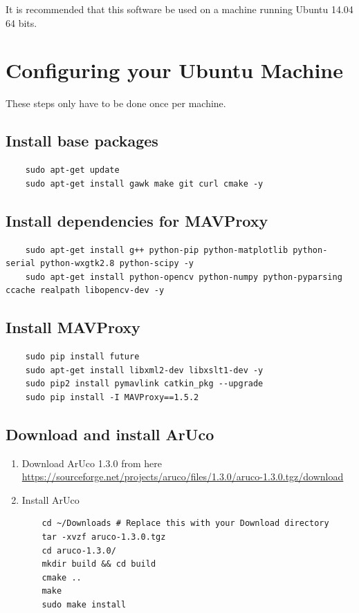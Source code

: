 \documentclass{report}
\begin{document}
It is recommended that this software be used on a machine running Ubuntu 14.04 64 bits.

\section{Configuring your Ubuntu Machine}
These steps only have to be done once per machine.
\subsection{Install base packages}
\begin{lstlisting}
	sudo apt-get update
	sudo apt-get install gawk make git curl cmake -y
\end{lstlisting}

\subsection{Install dependencies for MAVProxy}
\begin{lstlisting}
	sudo apt-get install g++ python-pip python-matplotlib python-serial python-wxgtk2.8 python-scipy -y
	sudo apt-get install python-opencv python-numpy python-pyparsing ccache realpath libopencv-dev -y
\end{lstlisting}

\subsection{Install MAVProxy}
\begin{lstlisting}
	sudo pip install future
	sudo apt-get install libxml2-dev libxslt1-dev -y
	sudo pip2 install pymavlink catkin_pkg --upgrade
	sudo pip install -I MAVProxy==1.5.2
\end{lstlisting}

\subsection{Download and install ArUco}
\begin{enumerate}
	\item Download ArUco 1.3.0 from here \href{https://sourceforge.net/projects/aruco/files/1.3.0/aruco-1.3.0.tgz/download}{https://sourceforge.net/projects/aruco/files/1.3.0/aruco-1.3.0.tgz/download}
	
	\item Install ArUco

\begin{lstlisting}
	cd ~/Downloads # Replace this with your Download directory
	tar -xvzf aruco-1.3.0.tgz
	cd aruco-1.3.0/
	mkdir build && cd build
	cmake ..
	make
	sudo make install
\end{lstlisting}
\end{enumerate}
\end{document}
